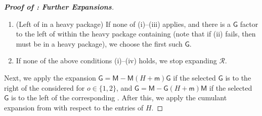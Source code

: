 \documentclass[10pt,reqno]{amsart}
\numberwithin{equation}{section}
\numberwithin{figure}{section}
\theoremstyle{plain} %
\theoremstyle{definition} %
\newcommand{\wt}{\widetilde}
\newcommand{\cR}{{\mathcal R}}
\newcommand{\sG}{\mathsf G}
\newcommand{\sM}{\mathsf M}
\newcommand{\smm}{\mathsf m}
\newcommand{\pa}[1]{\left({#1}\right)}
\newcommand{\tLambda}{{\wt{\Lambda}}}
\newcommand{\tl}{\tLambda}
\numberwithin{equation}{section}
\begin{document}
\begin{proof}[\bf Proof of : Further Expansions]
\begin{enumerate}
        
       
       
        \item (Left of \smash{$\tl_2$} in a heavy package) If none of (i)--(iii) applies, and there is a $\sG$ factor to the left of \smash{$\tl_2$} within the heavy package containing \smash{$\tl_2$} (note that if (ii) fails, then \smash{$\tl_2$} must be in a heavy package), we choose the first such $\sG$.
        
        \item If none of the above conditions (i)--(iv) holds, we stop expanding $\cR$.
        
    \end{enumerate}
    Next, we apply the expansion $\sG=\sM-\sM\pa{H+\smm}\sG$ if the selected $\sG$ is to the right of the considered \smash{$\tl_o$} for $o \in \{1, 2\}$,  and $\sG=\sM-\sG\pa{H+\smm}\sM$ if the selected $\sG$ is to the left of the corresponding \smash{$\tl_o$}. After this, we apply the cumulant expansion from  with respect to the entries of $H$. 
    
    

\end{proof}
\end{document}
